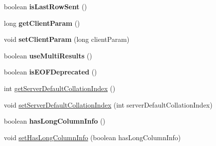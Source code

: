 \begin{DoxyCompactItemize}
boolean {\bfseries is\+Last\+Row\+Sent} ()
\item 
\mbox{\label{classcom_1_1mysql_1_1cj_1_1protocol_1_1a_1_1_native_server_session_a027379497479b7a43755ff49ad37e96f}} 
long {\bfseries get\+Client\+Param} ()
\item 
\mbox{\label{classcom_1_1mysql_1_1cj_1_1protocol_1_1a_1_1_native_server_session_a6b2f480c08fa965e6559157f71a86970}} 
void {\bfseries set\+Client\+Param} (long client\+Param)
\item 
\mbox{\label{classcom_1_1mysql_1_1cj_1_1protocol_1_1a_1_1_native_server_session_a1ee7647193508670b38da91c9f39e11f}} 
boolean {\bfseries use\+Multi\+Results} ()
\item 
\mbox{\label{classcom_1_1mysql_1_1cj_1_1protocol_1_1a_1_1_native_server_session_adeaa0a01acf79d5b609ce8757822948d}} 
boolean {\bfseries is\+E\+O\+F\+Deprecated} ()
\item 
int \mbox{\hyperlink{classcom_1_1mysql_1_1cj_1_1protocol_1_1a_1_1_native_server_session_aeaccfa02aeae2a872f2d92412a051de0}{get\+Server\+Default\+Collation\+Index}} ()
\item 
void \mbox{\hyperlink{classcom_1_1mysql_1_1cj_1_1protocol_1_1a_1_1_native_server_session_abd6266538f2562073361edbc958a3304}{set\+Server\+Default\+Collation\+Index}} (int server\+Default\+Collation\+Index)
\item 
\mbox{\label{classcom_1_1mysql_1_1cj_1_1protocol_1_1a_1_1_native_server_session_ac5dca7c3f6c90dc330ed8fb7f7c74069}} 
boolean {\bfseries has\+Long\+Column\+Info} ()
\item 
void \mbox{\hyperlink{classcom_1_1mysql_1_1cj_1_1protocol_1_1a_1_1_native_server_session_ab7e6639fd06a4d47ab35e3cd89dfc10a}{set\+Has\+Long\+Column\+Info}} (boolean has\+Long\+Column\+Info)
\item 
\mbox{\label{classcom_1_1mysql_1_1cj_1_1protocol_1_1a_1_1_native_server_session_a5d1f9481bc93bb7f3a7a1ab35298b626}} 

\end{DoxyCompactItemize}
